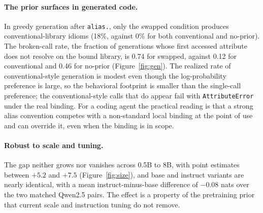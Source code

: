 \documentclass[11pt]{article}
\begin{document}
\paragraph{The prior surfaces in generated code.} In greedy generation after \texttt{alias.}, only the swapped condition produces conventional-library idioms (18\%, against 0\% for both conventional and no-prior). The broken-call rate, the fraction of generations whose first accessed attribute does not resolve on the bound library, is 0.74 for swapped, against 0.12 for conventional and 0.46 for no-prior (Figure~\ref{fig:gen}). The realized rate of conventional-style generation is modest even though the log-probability preference is large, so the behavioral footprint is smaller than the single-call preference; the conventional-style calls that do appear fail with \texttt{AttributeError} under the real binding. For a coding agent the practical reading is that a strong alias convention competes with a non-standard local binding at the point of use and can override it, even when the binding is in scope.

\paragraph{Robust to scale and tuning.} The gap neither grows nor vanishes across 0.5B to 8B, with point estimates between $+5.2$ and $+7.5$ (Figure~\ref{fig:size}), and base and instruct variants are nearly identical, with a mean instruct-minus-base difference of $-0.08$ nats over the two matched Qwen2.5 pairs. The effect is a property of the pretraining prior that current scale and instruction tuning do not remove.
\end{document}
